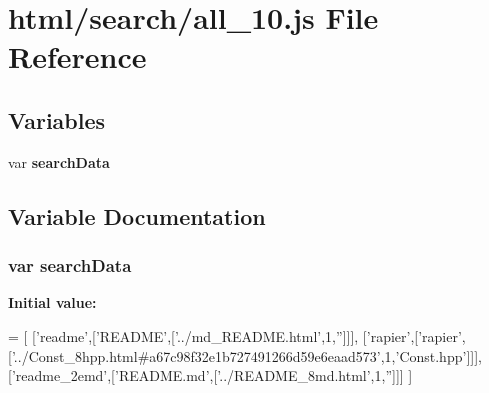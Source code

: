 \section{html/search/all\-\_\-10.js File Reference}
\label{all__10_8js}
\subsection*{Variables}
\begin{DoxyCompactItemize}
\item 
var {\bf search\-Data}
\end{DoxyCompactItemize}


\subsection{Variable Documentation}
\subsubsection[{search\-Data}]{\setlength{\rightskip}{0pt plus 5cm}var search\-Data}\label{all__10_8js_ad01a7523f103d6242ef9b0451861231e}
{\bfseries Initial value\-:}
\begin{DoxyCode}
=
[
  [\textcolor{stringliteral}{'readme'},[\textcolor{stringliteral}{'README'},[\textcolor{stringliteral}{'../md\_README.html'},1,\textcolor{stringliteral}{''}]]],
  [\textcolor{stringliteral}{'rapier'},[\textcolor{stringliteral}{'rapier'},[\textcolor{stringliteral}{'../Const\_8hpp.html#a67c98f32e1b727491266d59e6eaad573'},1,\textcolor{stringliteral}{'Const.hpp'}]]],
  [\textcolor{stringliteral}{'readme\_2emd'},[\textcolor{stringliteral}{'README.md'},[\textcolor{stringliteral}{'../README\_8md.html'},1,\textcolor{stringliteral}{''}]]]
]
\end{DoxyCode}

